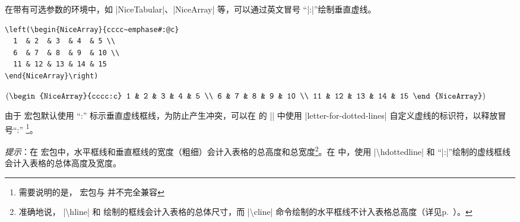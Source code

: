 \documentclass[dvipsnames]{article}%
\begin{document}
\bigskip
在带有可选参数的环境中，如 |{NiceTabular}|、|{NiceArray}| 等，可以通过英文冒号 “|:|”绘制垂直虚线。

\medskip
\begin{BVerbatim}[baseline=c,boxwidth=9.5cm]
\left(\begin{NiceArray}{cccc~emphase#:@c}
  1  & 2  & 3  & 4  & 5 \\
  6  & 7  & 8  & 9  & 10 \\
  11 & 12 & 13 & 14 & 15
\end{NiceArray}\right)
\end{BVerbatim}
$\left(\begin{NiceArray}{cccc:c}
1  & 2 & 3 & 4 & 5 \\
6  & 7 & 8 & 9 & 10 \\
11 & 12 & 13 & 14 & 15 
\end{NiceArray}\right)$

\bigskip

由于 宏包默认使用 “:” 标示垂直虚线框线，为防止产生冲突，可以在  的 |\NiceMatrixOptions| 中使用 |letter-for-dotted-lines| 自定义虚线的标识符，以释放冒号“:”
\footnote{需要说明的是， 宏包与  并不完全兼容}。

\bigskip


\emph{提示}：在  宏包中，水平框线和垂直框线的宽度（粗细）会计入表格的总高度和总宽度\footnote{准确地说， |\textbackslash hline| 和 \texttt{\textbar} 绘制的框线会计入表格的总体尺寸，而 |\textbackslash cline| 命令绘制的水平框线不计入表格总高度（详见p.~\pageref{remark-cline}）。}。在  中，使用 |\textbackslash hdottedline| 和 ``|:|''绘制的虚线框线会计入表格的总体高度及宽度。
%
%
%
\end{document}
